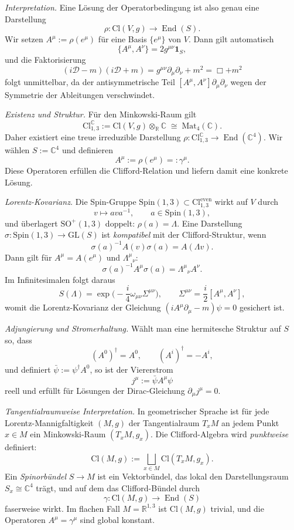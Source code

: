\documentclass[10pt, letterpaper]{article}
\newcommand{\R}{\mathbb{R}}
\newcommand{\C}{\mathbb{C}}
\newcommand{\Cl}{\mathrm{Cl}}
\newcommand{\GL}{\mathrm{GL}}
\newcommand{\Mat}{\mathrm{Mat}}
\newcommand{\SO}{\mathrm{SO}}
\newcommand{\Spin}{\mathrm{Spin}}
\begin{document}
\emph{Interpretation.}
Eine Lösung der Operatorbedingung ist also genau eine Darstellung
\[
\rho:\Cl(V,g)\longrightarrow\operatorname{End}(S).
\]
Wir setzen $A^\mu := \rho(e^\mu)$ für eine Basis $\{e^\mu\}$ von $V$.
Dann gilt automatisch
\[
\{A^\mu,A^\nu\}=2g^{\mu\nu}\mathbf 1_S,
\]
und die Faktorisierung
\[
(i\mathcal D - m)(i\mathcal D + m) = g^{\mu\nu}\partial_\mu\partial_\nu + m^2 = \Box + m^2
\]
folgt unmittelbar, da der antisymmetrische Teil $[A^\mu,A^\nu]\partial_\mu\partial_\nu$ wegen der Symmetrie der Ableitungen verschwindet.

\emph{Existenz und Struktur.}
Für den Minkowski-Raum gilt
\[
\Cl_{1,3}^{\C} := \Cl(V,g)\otimes_\R\C \;\cong\; \Mat_4(\C).
\]
Daher existiert eine treue irreduzible Darstellung $\rho:\Cl_{1,3}^{\C}\to\operatorname{End}(\C^4)$.
Wir wählen $S:=\C^4$ und definieren
\[
A^\mu := \rho(e^\mu) =: \gamma^\mu.
\]
Diese Operatoren erfüllen die Clifford-Relation und liefern damit eine konkrete Lösung.

\emph{Lorentz-Kovarianz.}
Die Spin-Gruppe $\Spin(1,3)\subset \Cl_{1,3}^{\mathrm{even}}$ wirkt auf $V$ durch
\[
v\longmapsto a v a^{-1},
\qquad a\in\Spin(1,3),
\]
und überlagert $\SO^+(1,3)$ doppelt:
$\rho(a)=\Lambda$.  
Eine Darstellung $\sigma:\Spin(1,3)\to\GL(S)$ ist \emph{kompatibel} mit der Clifford-Struktur, wenn
\[
\sigma(a)^{-1}A(v)\sigma(a)=A(\Lambda v).
\]
Dann gilt für $A^\mu=A(e^\mu)$ und $\Lambda^\mu{}_\nu$:
\[
\sigma(a)^{-1}A^\mu\sigma(a)=\Lambda^\mu{}_\nu A^\nu.
\]
Im Infinitesimalen folgt daraus
\[
S(\Lambda)
=\exp\!\Big(-\frac{i}{4}\omega_{\mu\nu}\Sigma^{\mu\nu}\Big),
\qquad
\Sigma^{\mu\nu}=\frac{i}{2}[A^\mu,A^\nu],
\]
womit die Lorentz-Kovarianz der Gleichung $(iA^\mu\partial_\mu-m)\psi=0$ gesichert ist.

\emph{Adjungierung und Stromerhaltung.}
Wählt man eine hermitesche Struktur auf $S$ so, dass
\[
(A^0)^\dagger=A^0,\qquad (A^i)^\dagger=-A^i,
\]
und definiert $\bar\psi:=\psi^\dagger A^0$, so ist der Viererstrom
\[
j^\mu:=\bar\psi A^\mu \psi
\]
reell und erfüllt für Lösungen der Dirac-Gleichung $\partial_\mu j^\mu=0$.

\emph{Tangentialraumweise Interpretation.}
In geometrischer Sprache ist für jede Lorentz-Mannigfaltigkeit $(M,g)$ der Tangentialraum $T_xM$ an jedem Punkt $x\in M$ ein Minkowski-Raum $(T_xM,g_x)$.
Die Clifford-Algebra wird \emph{punktweise} definiert:
\[
\Cl(M,g):=\bigsqcup_{x\in M}\Cl(T_xM,g_x).
\]
Ein \emph{Spinorbündel} $S\to M$ ist ein Vektorbündel, das lokal den Darstellungsraum $S_x\cong\C^4$ trägt, und auf dem das Clifford-Bündel durch
\[
\gamma:\Cl(M,g)\longrightarrow\operatorname{End}(S)
\]
faserweise wirkt.
Im flachen Fall $M=\R^{1,3}$ ist $\Cl(M,g)$ trivial, und die Operatoren $A^\mu=\gamma^\mu$ sind global konstant.
\end{document}

